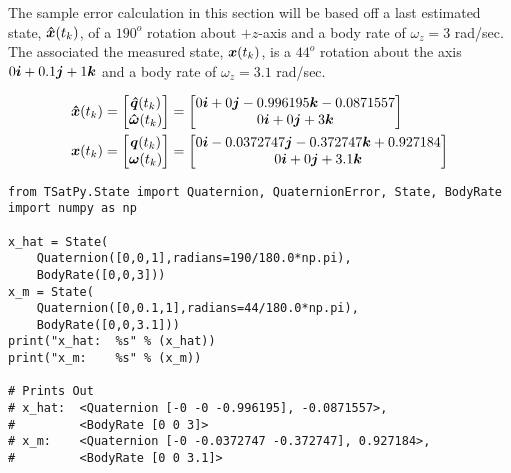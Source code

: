 The sample error calculation in this section will be based off a last estimated state, $\boldsymbol{\hat{x}}(t_{k})$, of a $190^o$ rotation about $+z$-axis and a body rate of $\omega_z = 3$ rad/sec.  The associated the measured state, $\boldsymbol{x}(t_{k})$, is a $44^o$ rotation about the axis $0 \boldsymbol{i} + 0.1 \boldsymbol{j} + 1\boldsymbol{k}$ and a body rate of $\omega_z = 3.1$ rad/sec.


\begin{subequations}
  \begin{align}
    \boldsymbol{\hat{x}}(t_{k})
    = \begin{bmatrix}  \boldsymbol{\hat{q}}(t_{k}) \\ \boldsymbol{\hat{\omega}}(t_{k}) \end{bmatrix}
    &= \begin{bmatrix} 0 \boldsymbol{i} +0 \boldsymbol{j} -0.996195 \boldsymbol{k} -0.0871557 \\ 0 \boldsymbol{i} +0 \boldsymbol{j} +3 \boldsymbol{k} \end{bmatrix}\\
    \boldsymbol{x}(t_{k})
    = \begin{bmatrix}  \boldsymbol{q}(t_{k}) \\ \boldsymbol{\omega}(t_{k}) \end{bmatrix}
    &= \begin{bmatrix} 0 \boldsymbol{i} -0.0372747 \boldsymbol{j} -0.372747 \boldsymbol{k} +0.927184 \\ 0 \boldsymbol{i} +0 \boldsymbol{j} +3.1 \boldsymbol{k} \end{bmatrix}
  \end{align}
  \label{eqn:StateDifferenceQuaternionSamples}
\end{subequations}

\begin{singlespace}
  \begin{verbatim}
from TSatPy.State import Quaternion, QuaternionError, State, BodyRate
import numpy as np

x_hat = State(
    Quaternion([0,0,1],radians=190/180.0*np.pi),
    BodyRate([0,0,3]))
x_m = State(
    Quaternion([0,0.1,1],radians=44/180.0*np.pi),
    BodyRate([0,0,3.1]))
print("x_hat:  %s" % (x_hat))
print("x_m:    %s" % (x_m))

# Prints Out
# x_hat:  <Quaternion [-0 -0 -0.996195], -0.0871557>,
#         <BodyRate [0 0 3]>
# x_m:    <Quaternion [-0 -0.0372747 -0.372747], 0.927184>,
#         <BodyRate [0 0 3.1]>
  \end{verbatim}
\nocite{minted}
\end{singlespace}

